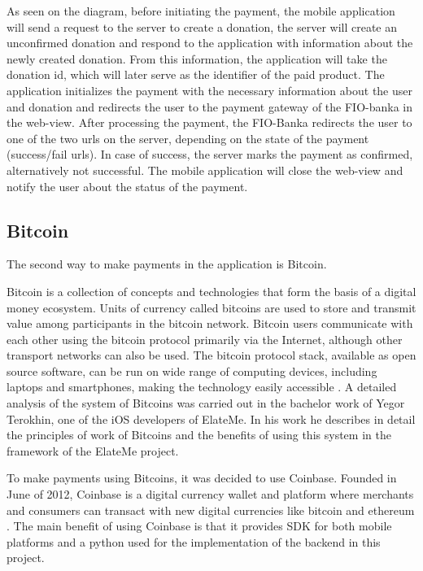
As seen on the diagram, before initiating the payment, the mobile application will send a request to the server to
create a donation, the server will create an unconfirmed donation and respond to the application with information about
the newly created donation. From this information, the application will take the donation id, which will later serve as
the identifier of the paid product. The application initializes the payment with the necessary information about the
user and donation and redirects the user to the payment gateway of the FIO-banka in the web-view. After processing the
payment, the FIO-Banka redirects the user to one of the two urls on the server, depending on the state of
the payment (success/fail urls). In case of success, the server marks the payment as confirmed, alternatively not
successful. The mobile application will close the web-view and notify the user about the status of the payment.

\subsection{Bitcoin}
The second way to make payments in the application is Bitcoin.

Bitcoin is a collection of concepts and technologies that form the basis of a digital money ecosystem. Units of currency
called bitcoins are used to store and transmit value among participants in the bitcoin network. Bitcoin users
communicate with each other using the bitcoin protocol primarily via the Internet, although other transport networks can
also be used. The bitcoin protocol stack, available as open source software, can be run on wide range of computing
devices, including laptops and smartphones, making the technology easily accessible \cite{bitcoin}. A detailed analysis
of the system of Bitcoins was carried out in the bachelor work \cite{ios1} of Yegor Terokhin, one of the iOS developers
of ElateMe. In his work he describes in detail the principles of work of Bitcoins and the benefits of using this system
in the framework of the ElateMe project.

To make payments using Bitcoins, it was decided to use Coinbase. Founded in June of 2012, Coinbase is a digital currency
wallet and platform where merchants and consumers can transact with new digital currencies like bitcoin and ethereum
\cite{coinbase}. The main benefit of using Coinbase is that it provides \ac{SDK} for both mobile platforms and a python
used for the implementation of the backend in this project.

